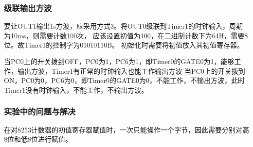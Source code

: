 \documentclass[12pt, a4paper, oneside]{ctexart}
\begin{document}
    \subsubsection{级联输出方波}
    要让OUT1输出1s方波，应采用方式3。将OUT0级联到Timer1的时钟输入，周期为10ms，则需要计数100次，
    应该设置初值为100，在二进制计数下为64H，需要8位。故Timer1的控制字为01010110B。
    初始化时需要将初值放入其初值寄存器。

    当PC0上的开关拨到OFF，PC0为1，PC6为1，即Timer0的GATE0为1，能够工作，输出方波，Timer1有正常的时钟输入也能工作输出方波
    当PC0上的开关拨到ON，PC0为0，PC6为0，即Timer0的GATE0为0，不能工作，不输出方波，此时Timer1没有时钟输入，不能工作，不输出方波。
    \subsubsection{实验中的问题与解决}
    在对8253计数器的初值寄存器赋值时，一次只能操作一个字节，因此需要分别对高8位和低8位进行赋值。

    
\end{document}
